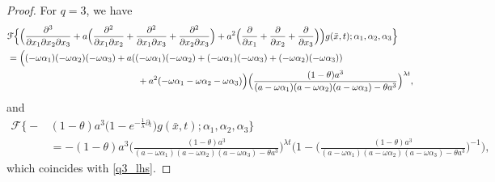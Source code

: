 \documentclass[12pt,oneside,reqno]{amsart}
\numberwithin{equation}{section}
\theoremstyle{definition}
\numberwithin{equation}{section}
\theoremstyle{remarkstyle}
\begin{document}
\begin{proof}
For $q=3$, we have
{\scriptsize	\begin{align}\label{q3_lhs}
		&\mathcal{F}\Bigl\{\Big(\frac{\partial^3}{\partial x_1\partial x_2\partial x_3}+a\Big(\frac{\partial^2}{\partial x_1\partial x_2}+\frac{\partial^2}{\partial x_1\partial x_3}+\frac{\partial^2}{\partial x_2\partial x_3}\Big)+a^2\Big(\frac{\partial}{\partial x_1}+\frac{\partial}{\partial x_2}+\frac{\partial}{\partial x_3}\Big)\Big)g(\bar{x},t);\alpha_1,\alpha_2,\alpha_3\Bigr\}\nonumber\\
		&=\Big((-\omega\alpha_1)(-\omega\alpha_2)(-\omega\alpha_3)+a((-\omega\alpha_1)(-\omega\alpha_2)+(-\omega\alpha_1)(-\omega\alpha_3)+(-\omega\alpha_2)(-\omega\alpha_3))\nonumber\\
		&\hspace{5cm}+a^2(-\omega\alpha_1-\omega\alpha_2-\omega\alpha_3)\Big)
		\Big(\frac{(1-\theta)a^3}{(a-\omega\alpha_1)(a-\omega\alpha_2)(a-\omega\alpha_3)-\theta a^3}\Big)^{\lambda t},
	\end{align}}
	and
{\scriptsize \begin{align*}
		\mathcal{F}\Big\{-&(1-\theta)a^3\Big(1-e^{-\frac{1}{\lambda}\partial_t}\Big)g(\bar{x},t);\alpha_1,\alpha_2,\alpha_3\Big\}\\
		&=-(1-\theta)a^3 \Big(\frac{(1-\theta)a^3}{(a-\omega\alpha_1)(a-\omega\alpha_2)(a-\omega\alpha_3)-\theta a^3}\Big)^{\lambda t}\Big(1-\Big(\frac{(1-\theta)a^3}{(a-\omega\alpha_1)(a-\omega\alpha_2)(a-\omega\alpha_3)-\theta a^3}\Big)^{-1}\Big),
	\end{align*}}
	which coincides with \eqref{q3_lhs}.
	
	
	

\end{proof}
\end{document}
